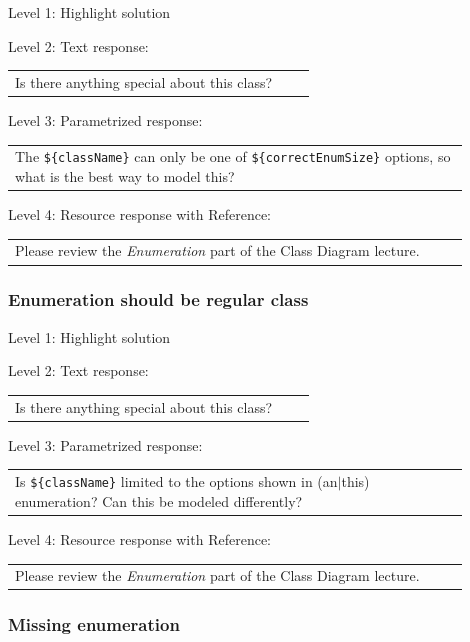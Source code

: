 \noindent Level 1: Highlight solution \medskip

\noindent Level 2: Text response: \medskip

\begin{tabular}{|p{0.9\linewidth}}
Is there anything special about this class?
\end{tabular} \medskip

\noindent Level 3: Parametrized response: \medskip

\begin{tabular}{|p{0.9\linewidth}}
The \verb|${className}| can only be one of \verb|${correctEnumSize}| options, so what is the best way to model this?
\end{tabular} \medskip

\noindent Level 4: Resource response with Reference: \medskip

\begin{tabular}{|p{0.9\linewidth}}
Please review the \textit{Enumeration} part of the Class Diagram lecture.
\end{tabular} \medskip


\subsubsection{Enumeration should be regular class}

\noindent Level 1: Highlight solution \medskip

\noindent Level 2: Text response: \medskip

\begin{tabular}{|p{0.9\linewidth}}
Is there anything special about this class?
\end{tabular} \medskip

\noindent Level 3: Parametrized response: \medskip

\begin{tabular}{|p{0.9\linewidth}}
Is \verb|${className}| limited to the options shown in (an$|$this) enumeration? Can this be modeled differently?
\end{tabular} \medskip

\noindent Level 4: Resource response with Reference: \medskip

\begin{tabular}{|p{0.9\linewidth}}
Please review the \textit{Enumeration} part of the Class Diagram lecture.
\end{tabular} \medskip


\subsubsection{Missing enumeration}

